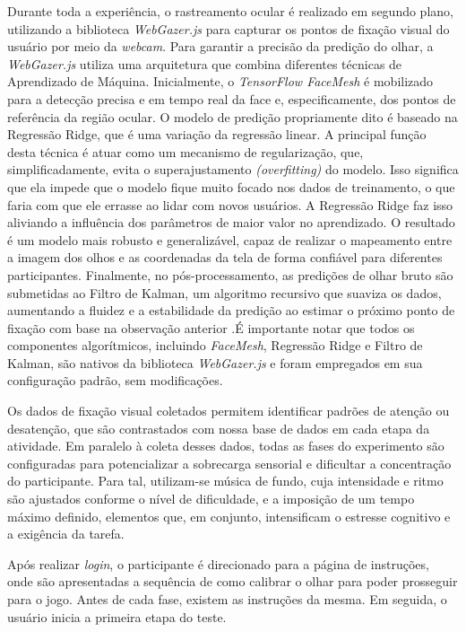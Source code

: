 Durante toda a experiência, o rastreamento ocular é realizado em segundo plano, utilizando a biblioteca \textit{WebGazer.js} para capturar os pontos de fixação visual do usuário por meio da \textit{webcam}. Para garantir a precisão da predição do olhar, a \textit{WebGazer.js} utiliza uma arquitetura que combina diferentes técnicas de Aprendizado de Máquina. Inicialmente, o \textit{TensorFlow FaceMesh} é mobilizado para a detecção precisa e em tempo real da face e, especificamente, dos pontos de referência da região ocular. O modelo de predição propriamente dito é baseado na Regressão Ridge, que é uma variação da regressão linear. A principal função desta técnica é atuar como um mecanismo de regularização, que, simplificadamente, evita o superajustamento \textit{(overfitting)} do modelo. Isso significa que ela impede que o modelo fique muito focado nos dados de treinamento, o que faria com que ele errasse ao lidar com novos usuários. A Regressão Ridge faz isso aliviando a influência dos parâmetros de maior valor no aprendizado. O resultado é um modelo mais robusto e generalizável, capaz de realizar o mapeamento entre a imagem dos olhos e as coordenadas da tela de forma confiável para diferentes participantes. Finalmente, no pós-processamento, as predições de olhar bruto são submetidas ao Filtro de Kalman, um algoritmo recursivo que suaviza os dados, aumentando a fluidez e a estabilidade da predição ao estimar o próximo ponto de fixação com base na observação anterior \cite{WebGazerDoc}.É importante notar que todos os componentes algorítmicos, incluindo \textit{FaceMesh}, Regressão Ridge e Filtro de Kalman, são nativos da biblioteca \textit{WebGazer.js} e foram empregados em sua configuração padrão, sem modificações.

Os dados de fixação visual coletados permitem identificar padrões de atenção ou desatenção, que são contrastados com nossa base de dados em cada etapa da atividade. Em paralelo à coleta desses dados, todas as fases do experimento são configuradas para potencializar a sobrecarga sensorial e dificultar a concentração do participante. Para tal, utilizam-se música de fundo, cuja intensidade e ritmo são ajustados conforme o nível de dificuldade, e a imposição de um tempo máximo definido, elementos que, em conjunto, intensificam o estresse cognitivo e a exigência da tarefa.

Após realizar \textit{login}, o participante é direcionado para a página de instruções, onde são apresentadas a sequência de como calibrar o olhar para poder prosseguir para o jogo. Antes de cada fase, existem as instruções da mesma. Em seguida, o usuário inicia a primeira etapa do teste. 

